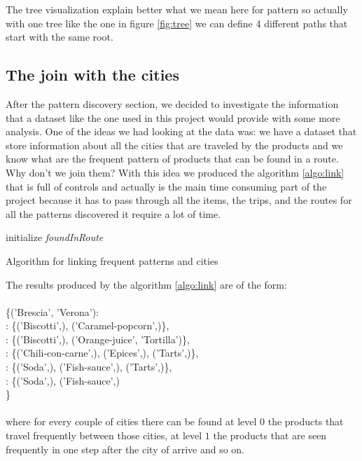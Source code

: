 \documentclass{acm_proc_article-sp-sigmod09}
\begin{document}
	The tree visualization explain better what we mean here for pattern so actually with one tree like the one in figure \ref{fig:tree} we can define 4 different paths that start with the same root.
	\subsection{The join with the cities}
	After the pattern discovery section, we decided to investigate the information that a dataset like the one used in this project would provide with some more analysis.
	One of the ideas we had looking at the data was: we have a dataset that store information about all the cities that are traveled by the products and we know what are the frequent pattern of products that can be found in a route. Why don't we join them? With this idea we produced the algorithm \ref{algo:link} that is full of controls and actually is the main time consuming part of the project because it has to pass through all the items, the trips, and the routes for all the patterns discovered it require a lot of time.
	
	\begin{algorithm}[]
		\SetAlgoLined
		initialize \textit{foundInRoute} \\
		\label{algo:link}
		\caption{Algorithm for linking frequent patterns and cities}
	\end{algorithm}
	\newpage
	The results produced by the algorithm \ref{algo:link} are of the form:\\ \\
	\null \qquad \{('Brescia', 'Verona'): \\
	\null \qquad \qquad {}: \{('Biscotti',), ('Caramel-popcorn',)\}, \\
	\null \qquad \qquad {}: \{('Biscotti',), ('Orange-juice', 'Tortilla')\}, \\
	\null \qquad \qquad {}: \{('Chili-con-carne',), ('Epices',), ('Tarts',)\}, \\
	\null \qquad \qquad {}: \{('Soda',), ('Fish-sauce',), ('Tarts',)\}, \\
	\null \qquad \qquad {}: \{('Soda',), ('Fish-sauce',)\\
	\null \qquad\}\\ \\
	where for every couple of cities there can be found at level $0$ the products that travel frequently between those cities, at level $1$ the products that are seen frequently in one step after the city of arrive and so on.
	
\end{document}
